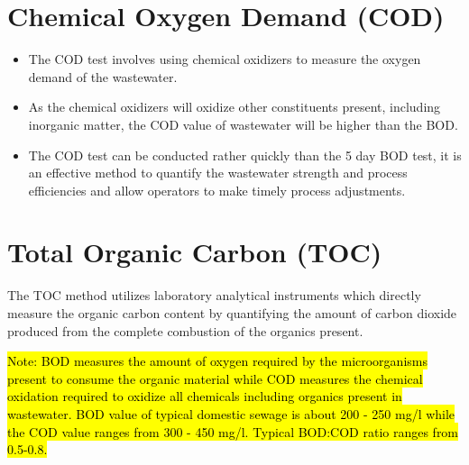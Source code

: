 \begin{itemize}
			    \section{Chemical Oxygen Demand (COD)}
			      	\begin{itemize}
			      		\item The COD test involves using chemical oxidizers to measure the oxygen demand of the wastewater.
			      		\item As the chemical oxidizers will oxidize other constituents present, including inorganic matter, the COD value of wastewater will be higher than the BOD.  
			      		\item The COD test can be conducted rather quickly than the 5 day BOD test, it is an effective method to quantify the wastewater strength and process efficiencies and allow operators to make timely process adjustments.
			      	\end{itemize}

			    \section{Total Organic Carbon (TOC)}
			      	The TOC method utilizes laboratory analytical instruments which directly measure the organic carbon content by quantifying the amount of carbon dioxide produced from the complete combustion of the organics present.
		\end{itemize}
		
		
		
			\hl{Note: BOD measures the amount of oxygen required by the microorganisms present to consume the organic material while COD measures the chemical oxidation required to oxidize all chemicals including organics present in wastewater.  BOD value of typical domestic sewage is about 200 - 250 mg/l while the COD value ranges from 300 - 450 mg/l.  Typical BOD:COD ratio ranges from 0.5-0.8.}\\



